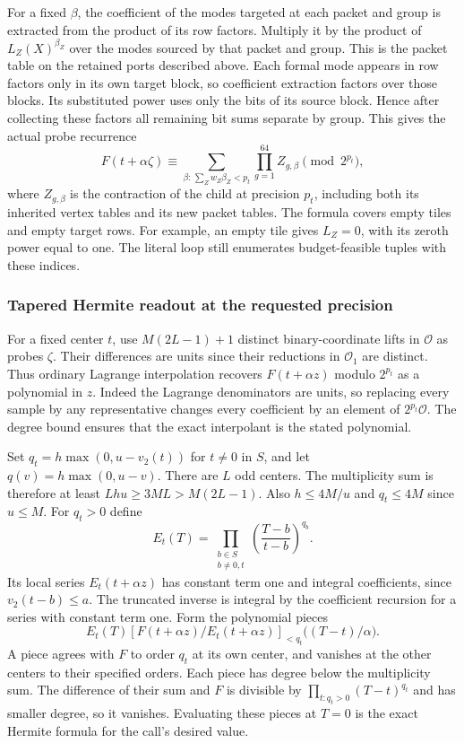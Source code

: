 \documentclass[
  11pt,
]{article}
\begin{document}
For a fixed \(\beta\), the coefficient of the modes targeted at
each packet and group is extracted from the product of its row
factors. Multiply it by the product of \(L_Z(X)^{\beta_Z}\)
over the modes sourced by that packet and group. This is the
packet table on the retained ports described above. Each formal
mode appears in row factors only in its own target block, so
coefficient extraction factors over those blocks. Its substituted
power uses only the bits of its source block. Hence after collecting
these factors all remaining bit sums separate by group. This gives
the actual probe recurrence
\begin{equation}
 F(t+\alpha\zeta)\equiv
   \sum_{\beta:\,\sum_Z w_Z\beta_Z<p_t}
      \prod_{g=1}^{64} Z_{g,\beta}\pmod{2^{p_t}},
 \label{eq:appendix-c-sample}
\end{equation}
where \(Z_{g,\beta}\) is the contraction of the child at precision
\(p_t\), including both its inherited vertex tables and its new
packet tables. The formula covers empty tiles and empty target
rows. For example, an empty tile gives \(L_Z=0\), with its
zeroth power equal to one. The literal loop still enumerates
budget-feasible tuples with these indices.

\subsubsection*{Tapered Hermite readout at the requested precision}

For a fixed center \(t\), use \(M(2L-1)+1\) distinct binary-coordinate
lifts in \(\mathcal O\) as probes \(\zeta\). Their differences are
units since their reductions in \(\mathcal O_1\) are distinct.
Thus ordinary Lagrange interpolation recovers
\(F(t+\alpha z)\) modulo \(2^{p_t}\) as a polynomial in \(z\).
Indeed the Lagrange denominators are units, so replacing every
sample by any representative changes every coefficient by an
element of \(2^{p_t}\mathcal O\). The degree bound ensures that
the exact interpolant is the stated polynomial.

Set \(q_t=h\max(0,u-v_2(t))\) for \(t\ne0\) in \(S\), and
let \(q(v)=h\max(0,u-v)\).
There are \(L\) odd centers. The multiplicity sum is therefore
at least \(Lhu\ge3ML>M(2L-1)\).
Also \(h\le4M/u\) and \(q_t\le4M\) since \(u\le M\).
For \(q_t>0\) define
\[
          E_t(T)=\prod_{\substack{b\in S\\ b\ne0,t}}
                      \left(\frac{T-b}{t-b}\right)^{q_b}.
\]
Its local series \(E_t(t+\alpha z)\) has constant term one and
integral coefficients, since \(v_2(t-b)\le a\). The truncated
inverse is integral by the coefficient recursion for a series
with constant term one. Form the polynomial pieces
\[
 E_t(T)\left[
    F(t+\alpha z)/E_t(t+\alpha z)
    \right]_{<q_t}\bigl((T-t)/\alpha\bigr).
\]
A piece agrees with \(F\) to order \(q_t\) at its own center,
and vanishes at the other centers to their specified orders.
Each piece has degree below the multiplicity sum. The difference
of their sum and \(F\) is divisible by
\(\prod_{t:q_t>0}(T-t)^{q_t}\) and has smaller degree, so it
vanishes. Evaluating these pieces at \(T=0\) is the exact
Hermite formula for the call's desired value.
\end{document}
